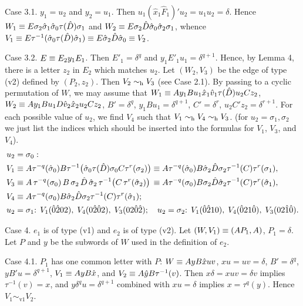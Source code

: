 Case 3.1. $y_1=u_2$ and $y_2=u_1$. Then $u_1(\hat x_1\hat F_1)'u_2=u_1u_2=\delta$.
Hence
$W_1\equiv E \sigma_2\hat\sigma_1\hat\sigma_0\tau(\hat D)\sigma_1$ and
$W_2\equiv E \sigma_2\hat D\hat\sigma_0\hat\sigma_2\sigma_1$, whence
$V_1\equiv E\tau^{-1}(\hat\sigma_0\tau(\hat D)\hat\sigma_1)
\equiv E\hat\sigma_2\hat D\hat\sigma_0\equiv V_2$.


Case 3.2. $E\equiv E_2y_1E_1$. Then $E'_1=\delta^q$ and
$y_1E'_1u_1=\delta^{q+1}$. Hence, by Lemma 4, there is a letter $z_2$
in $E_2$ which matches $u_2$. Let $(W_2,V_3)$ be the edge
of type (v2) defined by $(P_2,z_2)$. Then
$V_2\sim_{\text{h}} V_3$ (see Case 2.1).
By passing to a cyclic permutation of $W$, we may assume that
$W_1\equiv Ay_1Bu_1\hat x_1\hat v_1\tau(\hat D)u_2Cz_2$,
$W_2\equiv Ay_1Bu_1D\hat v_2\hat x_2u_2Cz_2$,
$B'=\delta^q$, $y_1Bu_1=\delta^{q+1}$, $C'=\delta^r$, $u_2C'z_2=\delta^{r+1}$.
For each possible value of $u_2$,
we find $V_4$ such that $V_1\sim_{\text{h}} V_4\sim_{\text{h}} V_3$.
(for $u_2=\sigma_1,\sigma_2$ we just list the indices which should be inserted into
the formulas for $V_1$, $V_3$, and $V_4$).
$$
\split
 u_2&=\sigma_0:
\\
 V_1&\letterwise A\tau^{-q}(\hat\sigma_0)B\tau^{-1}\big(\hat\sigma_0
   \tau(\hat D) \sigma_0C\tau^r(\sigma_2)\big)
   \letterwise
   A\tau^{-q}(\hat\sigma_0)B \hat\sigma_2
   \hat D \sigma_2\tau^{-1}(C)\tau^r(\sigma_1),
\\
 V_3&\letterwise A\,\tau^{-q}(\sigma_0)\,B\,\sigma_2 \,\hat D\, 
     \hat\sigma_2\,\tau^{-1}\big( C\,\tau^r(\hat\sigma_2)\big)
   \,\letterwise
    A\tau^{-q}(\sigma_0)B\sigma_2 \hat D 
     \hat\sigma_2\tau^{-1}(C)\tau^r(\hat\sigma_1),
\\
 V_4&\letterwise
   A\tau^{-q}(\sigma_0)B\hat\sigma_2 \hat D
         \sigma_2\tau^{-1}(C)\tau^r(\hat\sigma_1);
\\
u_2&=\sigma_1{:}\,\;
V_1(\hat0 \hat2 0 2),\; V_4(0 \hat2 \hat0 2),\; V_3(0 2 \hat0 \hat2);
 \quad
u_2=\sigma_2{:}\,\;
V_1(\hat0 \hat2 1 0),\; V_4(\hat0 2 1 \hat0),\; V_3(0 2 \hat1 \hat0).
\endsplit
$$

Case 4. $e_1$ is of type (v1) and $e_2$ is of type (v2).
Let $(W,V_1)\equiv (AP_1,A)$, $P_1=\delta$.
Let $P$ and $y$ be the subwords of $W$ used in the definition of $e_2$.

Case 4.1. $P_1$ has one common letter with $P$:
$W\equiv AyB\hat xuv$, $xu=uv=\delta$, $B'=\delta^q$, $yB'u=\delta^{q+1}$,
$V_1\equiv AyB\hat x$, and $V_2\equiv A\hat yB\tau^{-1}(v)$.
Then $x\delta=xuv=\delta v$ implies $\tau^{-1}(v)=x$, and
$y\delta^qu=\delta^{q+1}$ combined with $xu=\delta$ implies $x=\tau^q(y)$.
Hence $V_1\sim_{\text{v1}}V_2$.

